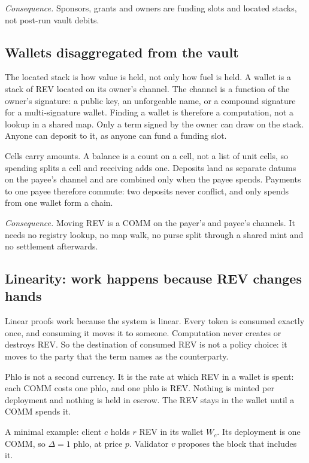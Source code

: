 \documentclass[11pt]{article}
\newcommand{\code}{\path}
\begin{document}
\emph{Consequence.} Sponsors, grants and owners are funding slots and located stacks, not post-run vault debits.

\subsection{Wallets disaggregated from the vault}

The located stack is how value is held, not only how fuel is held. A wallet is a stack of REV located on its owner's channel. The channel is a function of the owner's signature: a public key, an unforgeable name, or a compound signature for a multi-signature wallet. Finding a wallet is therefore a computation, not a lookup in a shared map. Only a term signed by the owner can draw on the stack. Anyone can deposit to it, as anyone can fund a funding slot.

Cells carry amounts. A balance is a count on a cell, not a list of unit cells, so spending splits a cell and receiving adds one. Deposits land as separate datums on the payee's channel and are combined only when the payee spends. Payments to one payee therefore commute: two deposits never conflict, and only spends from one wallet form a chain.

\emph{Consequence.} Moving REV is a COMM on the payer's and payee's channels. It needs no registry lookup, no map walk, no purse split through a shared mint and no settlement afterwards.

\subsection{Linearity: work happens because REV changes hands}\label{sec:linear}

Linear proofs work because the system is linear. Every token is consumed exactly once, and consuming it moves it to someone. Computation never creates or destroys REV. So the destination of consumed REV is not a policy choice: it moves to the party that the term names as the counterparty.

Phlo is not a second currency. It is the rate at which REV in a wallet is spent: each COMM costs one phlo, and one phlo is \code{phloPrice} REV. Nothing is minted per deployment and nothing is held in escrow. The REV stays in the wallet until a COMM spends it.

A minimal example: client $c$ holds $r$ REV in its wallet $W_c$. Its deployment is one COMM, so $\Delta = 1$ phlo, at price $p$. Validator $v$ proposes the block that includes it.
\end{document}
